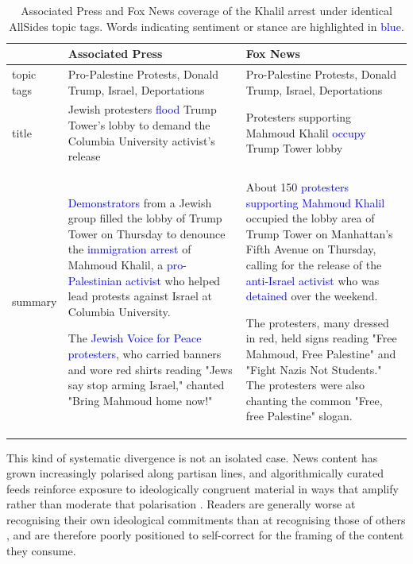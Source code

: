 \begin{table}[ht!]
    \centering
    \begin{tabular}{p{2cm}|p{6cm} | p{6cm}}
\toprule
 &  \textbf{Associated Press } & \textbf{Fox News} \\
 \midrule
topic tags &  Pro-Palestine Protests, Donald Trump, Israel, Deportations &  Pro-Palestine Protests, Donald Trump, Israel, Deportations \\
\midrule
title & Jewish protesters \textcolor{blue}{flood} Trump Tower's lobby to demand the Columbia University activist's release & Protesters supporting Mahmoud Khalil \textcolor{blue}{occupy} Trump Tower lobby \\
\midrule
summary &

\textcolor{blue}{Demonstrators} from a Jewish group filled the lobby of Trump Tower on Thursday to denounce the \textcolor{blue}{immigration arrest} of Mahmoud Khalil, a \textcolor{blue}{pro-Palestinian activist} who helped lead protests against Israel at Columbia University.

The \textcolor{blue}{Jewish Voice for Peace protesters}, who carried banners and wore red shirts reading "Jews say stop arming Israel," chanted "Bring Mahmoud home now!"
 &

About 150 \textcolor{blue}{protesters supporting Mahmoud Khalil} occupied the lobby area of Trump Tower on Manhattan's Fifth Avenue on Thursday, calling for the release of the \textcolor{blue}{anti-Israel activist} who was \textcolor{blue}{detained} over the weekend.

The protesters, many dressed in red, held signs reading "Free Mahmoud, Free Palestine" and "Fight Nazis Not Students." The protesters were also chanting the common "Free, free Palestine" slogan. \\
\bottomrule
\end{tabular}
\caption{Associated Press and Fox News coverage of the Khalil arrest under identical AllSides topic tags. Words indicating sentiment or stance are highlighted in \textcolor{blue}{blue}.}
\label{fig:khalil}
\end{table}

This kind of systematic divergence is not an isolated case. News content has grown increasingly polarised along partisan lines, and algorithmically curated feeds reinforce exposure to ideologically congruent material in ways that amplify rather than moderate that polarisation \citep{flaxman2016filterbubblesechochambers, kitchens2020echochambersfilterbubbles, Garimella_Smith_Weiss_West_2021, cinelli2021echochambereffectsocialmedia}. Readers are generally worse at recognising their own ideological commitments than at recognising those of others \citep{wang2020bias}, and are therefore poorly positioned to self-correct for the framing of the content they consume.

